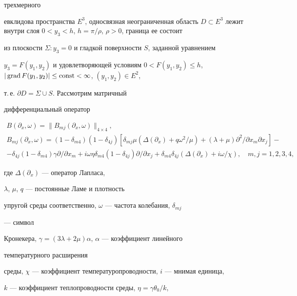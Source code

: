 трехмерного 


евклидова пространства $E^3$, односвязная неограниченная область $D\subset 


E^3$ лежит внутри слоя $0<y_3<h$, $h=\pi/\rho$, $\rho>0$, граница ее состоит 


из плоскости $\Sigma:y_3=0$ и гладкой поверхности $S$, заданной уравнением 


$y_3=F(y_1,y_2)$ и удовлетворяющей условиям $0<F(y_1,y_2)\le h$, $|\Grad 


F(y_1,y_2)|\le\const<\infty$, $(y_1,y_2)\in E^2$, 


т.\,е. $\partial D=\Sigma\cup S$. Рассмотрим матричный 


дифференциальный оператор 


\begin{gather*} 


B(\partial_x,\omega)=\|B_{mj}(\partial_x,\omega)\|_{4\times 4}, \\ 


% 


B_{mj}(\partial_x,\omega)=(1-\delta_{m4})(1-\delta_{4j}) 


[\delta_{mj}\mu(\Delta(\partial_x)+q\omega^2/\mu)+ 


(\lambda+\mu)\partial^2/\partial x_m\partial x_j]- \\ 


% 


-\delta_{4j}(1-\delta_{m4})\gamma\partial/\partial x_m+ 


i\omega\eta\delta_{m4}(1-\delta_{4j})\partial/\partial x_j 


+\delta_{m4}\delta_{4j}(\Delta(\partial_x)+i\omega/\chi),\quad 


m,j=1,2,3,4, 


\end{gather*} 


где $\Delta(\partial_x)$ --- оператор Лапласа, 


$\lambda$, $\mu$, $q$ --- постоянные Ламе и плотность 


упругой среды соответственно, $\omega$ --- частота колебания, $\delta_{mj}$ 


--- символ 


Кронекера, $\gamma=(3\lambda+2\mu)\alpha$, $\alpha$ --- коэффициент линейного 


температурного расширения 


среды, $\chi$ --- коэффициент температуропроводности, $i$ --- мнимая единица, 


$k$ --- коэффициент теплопроводности среды, $\eta=\gamma\theta_0/k$, 


